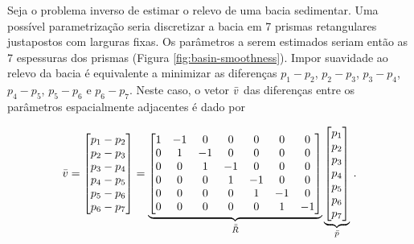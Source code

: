 \begin{example}
Seja o problema inverso de estimar o relevo de uma bacia
sedimentar. Uma possível parametrização seria discretizar a bacia em 7 prismas
retangulares justapostos com larguras fixas. Os parâmetros a serem estimados
seriam então as 7 espessuras dos prismas (Figura \ref{fig:basin-smoothness}).
Impor suavidade ao relevo da bacia é equivalente a minimizar as diferenças
$p_1 - p_2$, $p_2 - p_3$, $p_3 - p_4$, $p_4 - p_5$, $p_5 - p_6$ e $p_6 - p_7$.
Neste caso, o vetor $\bar{v}$ das diferenças entre os parâmetros espacialmente
adjacentes é dado por

\begin{equation}
\bar{v} =
    \begin{bmatrix}
    p_1 - p_2 \\ p_2 - p_3 \\ p_3 - p_4 \\ p_4 - p_5 \\ p_5 - p_6 \\ p_6 - p_7
    \end{bmatrix}
    =
    \underbrace{
    \begin{bmatrix}
    1 & -1 & 0 & 0 & 0 & 0 & 0\\
    0 & 1 & -1 & 0 & 0 & 0 & 0\\    
    0 & 0 & 1 & -1 & 0 & 0 & 0\\    
    0 & 0 & 0 & 1 & -1 & 0 & 0\\    
    0 & 0 & 0 & 0 & 1 & -1 & 0\\    
    0 & 0 & 0 & 0 & 0 & 1 & -1\\    
    \end{bmatrix}}_{\bar{\bar{R}}}    
    \underbrace{
    \begin{bmatrix}
    p_1 \\ p_2 \\ p_3 \\ p_4 \\ p_5 \\ p_6 \\ p_7
    \end{bmatrix}}_{\bar{p}}    
     \thinspace .
\end{equation}


\end{example}
